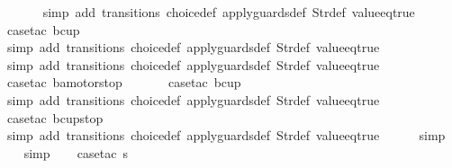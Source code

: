 \begin{isabellebody}
\ \ \ \ \ \isamarkupfalse%
\ {\isacharparenleft}simp\ add{\isacharcolon}\ transitions\ choice{\isacharunderscore}def\ apply{\isacharunderscore}guards{\isacharunderscore}def\ Str{\isacharunderscore}def\ value{\isacharunderscore}eq{\isacharunderscore}true{\isacharparenright}\isanewline
\ \ \ \ \isamarkupfalse%
\ {\isacharparenleft}case{\isacharunderscore}tac\ {\isachardoublequoteopen}bc{\isacharequal}up{}{}{\isachardoublequoteclose}{\isacharparenright}\isanewline
\ \ \ \ \ \isamarkupfalse%
\ {\isacharparenleft}simp\ add{\isacharcolon}\ transitions\ choice{\isacharunderscore}def\ apply{\isacharunderscore}guards{\isacharunderscore}def\ Str{\isacharunderscore}def\ value{\isacharunderscore}eq{\isacharunderscore}true{\isacharparenright}\isanewline
\ \ \ \ \isamarkupfalse%
\ {\isacharparenleft}simp\ add{\isacharcolon}\ transitions\ choice{\isacharunderscore}def\ apply{\isacharunderscore}guards{\isacharunderscore}def\ Str{\isacharunderscore}def\ value{\isacharunderscore}eq{\isacharunderscore}true{\isacharparenright}\isanewline
\ \ \ \isamarkupfalse%
\ {\isacharparenleft}case{\isacharunderscore}tac\ {\isachardoublequoteopen}ba{\isacharequal}motorstop\ {}{\isachardoublequoteclose}{\isacharparenright}\isanewline
\ \ \ \ \isamarkupfalse%
\ {\isacharparenleft}case{\isacharunderscore}tac\ {\isachardoublequoteopen}bc{\isacharequal}up{}{}{\isachardoublequoteclose}{\isacharparenright}\isanewline
\ \ \ \ \ \isamarkupfalse%
\ {\isacharparenleft}simp\ add{\isacharcolon}\ transitions\ choice{\isacharunderscore}def\ apply{\isacharunderscore}guards{\isacharunderscore}def\ Str{\isacharunderscore}def\ value{\isacharunderscore}eq{\isacharunderscore}true{\isacharparenright}\isanewline
\ \ \ \ \isamarkupfalse%
\ {\isacharparenleft}case{\isacharunderscore}tac\ {\isachardoublequoteopen}bc{\isacharequal}up{}{}stop{\isachardoublequoteclose}{\isacharparenright}\isanewline
\ \ \ \ \ \isamarkupfalse%
\ {\isacharparenleft}simp\ add{\isacharcolon}\ transitions\ choice{\isacharunderscore}def\ apply{\isacharunderscore}guards{\isacharunderscore}def\ Str{\isacharunderscore}def\ value{\isacharunderscore}eq{\isacharunderscore}true{\isacharparenright}\isanewline
\ \ \ \ \isamarkupfalse%
\ simp\isanewline
\ \ \isamarkupfalse%
\ simp\isanewline
\ \ \isamarkupfalse%
\ {\isacharparenleft}case{\isacharunderscore}tac\ {\isachardoublequoteopen}s{\isacharequal}{}{\isachardoublequoteclose}{\isacharparenright}\isanewline

\end{isabellebody}
